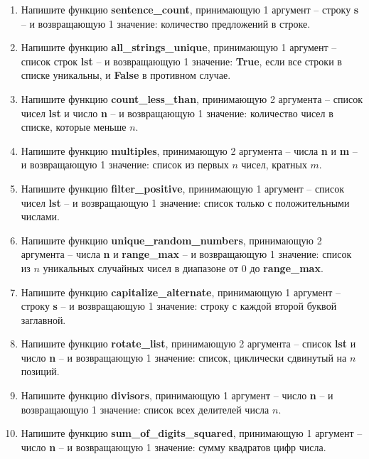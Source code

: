 \documentclass[a4,12pt]{article}
\theoremstyle{remark}
\begin{document}
\begin{enumerate}
    \item Напишите функцию \textbf{sentence\_count}, принимающую 1 аргумент – строку \textbf{s} – и возвращающую 1 значение: количество предложений в строке.
    \item Напишите функцию \textbf{all\_strings\_unique}, принимающую 1 аргумент – список строк \textbf{lst} – и возвращающую 1 значение: \textbf{True}, если все строки в списке уникальны, и \textbf{False} в противном случае.
    \item Напишите функцию \textbf{count\_less\_than}, принимающую 2 аргумента – список чисел \textbf{lst} и число \textbf{n} – и возвращающую 1 значение: количество чисел в списке, которые меньше $n$.
    \item Напишите функцию \textbf{multiples}, принимающую 2 аргумента – числа \textbf{n} и \textbf{m} – и возвращающую 1 значение: список из первых $n$ чисел, кратных $m$.
    \item Напишите функцию \textbf{filter\_positive}, принимающую 1 аргумент – список чисел \textbf{lst} – и возвращающую 1 значение: список только с положительными числами.
    \item Напишите функцию \textbf{unique\_random\_numbers}, принимающую 2 аргумента – числа \textbf{n} и \textbf{range\_max} – и возвращающую 1 значение: список из $n$ уникальных случайных чисел в диапазоне от 0 до \textbf{range\_max}.
    \item Напишите функцию \textbf{capitalize\_alternate}, принимающую 1 аргумент – строку \textbf{s} – и возвращающую 1 значение: строку с каждой второй буквой заглавной.
    \item Напишите функцию \textbf{rotate\_list}, принимающую 2 аргумента – список \textbf{lst} и число \textbf{n} – и возвращающую 1 значение: список, циклически сдвинутый на $n$ позиций.
    \item Напишите функцию \textbf{divisors}, принимающую 1 аргумент – число \textbf{n} – и возвращающую 1 значение: список всех делителей числа $n$.
    \item Напишите функцию \textbf{sum\_of\_digits\_squared}, принимающую 1 аргумент – число \textbf{n} – и возвращающую 1 значение: сумму квадратов цифр числа.


\end{enumerate}
\end{document}
